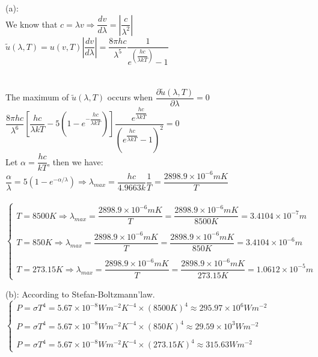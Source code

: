 \documentclass[fleqn]{article}
\begin{document}
\begin{enumerate}
    \textcolor{hwColor}{
      (a): \\
      We know that $c=\lambda v \Rightarrow \dfrac{dv}{d\lambda}=|\dfrac{c}{\lambda^2}|$ \\
      $\tilde{u}(\lambda, T)=u(v, T)|\dfrac{dv}{d\lambda}|=\dfrac{8 \pi hc}{\lambda^5}\dfrac{1}{e^{(\dfrac{hc}{\lambda kT})}-1}$ \\
      \\
      \\
      The maximum of $\tilde{u}(\lambda, T)$ occurs when $\dfrac{\partial \tilde{u}(\lambda, T)}{\partial \lambda}=0$ \\
      $\dfrac{8 \pi hc}{\lambda^6}\left[\dfrac{hc}{\lambda kT}-5(1-e^{-\dfrac{hc}{\lambda kT}})\right]\dfrac{e^{\dfrac{hc}{\lambda kT}}}{(e^{\dfrac{hc}{\lambda kT}}-1)^2}=0$ \\
      Let $\alpha=\dfrac{hc}{kT}$, then we have: \\
      $\dfrac{\alpha}{\lambda}=5(1-e^{-\alpha/\lambda}) \Longrightarrow \lambda_{max}=\dfrac{hc}{4.9663 k}\dfrac{1}{T}=\dfrac{2898.9 \times 10^{-6} mK}{T}$ \\
      \\
      $
        \begin{cases}
          T=8500 K \Rightarrow \lambda_{max}=\dfrac{2898.9 \times 10^{-6} mK}{T}=\dfrac{2898.9 \times 10^{-6} mK}{8500K}=3.4104 \times 10^{-7} m \\
          \\
          T=850 K \Rightarrow \lambda_{max}=\dfrac{2898.9 \times 10^{-6} mK}{T}=\dfrac{2898.9 \times 10^{-6} mK}{850K}=3.4104 \times 10^{-6} m \\
          \\
          T=273.15 K \Rightarrow \lambda_{max}=\dfrac{2898.9 \times 10^{-6} mK}{T}=\dfrac{2898.9 \times 10^{-6} mK}{273.15K}=1.0612 \times 10^{-5} m
        \end{cases}
      $
    }

    \bigbreak

    \textcolor{hwColor}{
      (b): According to Stefan-Boltzmann'law. \\
      $
        \begin{cases}
          P=\sigma T^4=5.67 \times 10^{-8} W m^{-2} K^{-4} \times (8500 K)^4 \approx 295.97 \times 10^6 W m^{-2} \\
          \\
          P=\sigma T^4=5.67 \times 10^{-8} W m^{-2} K^{-4} \times (850 K)^4 \approx 29.59 \times 10^3 W m^{-2} \\
          \\
          P=\sigma T^4=5.67 \times 10^{-8} W m^{-2} K^{-4} \times (273.15 K)^4 \approx 315.63 W m^{-2}
        \end{cases}
      $
    }
    

\end{enumerate}
\end{document}
